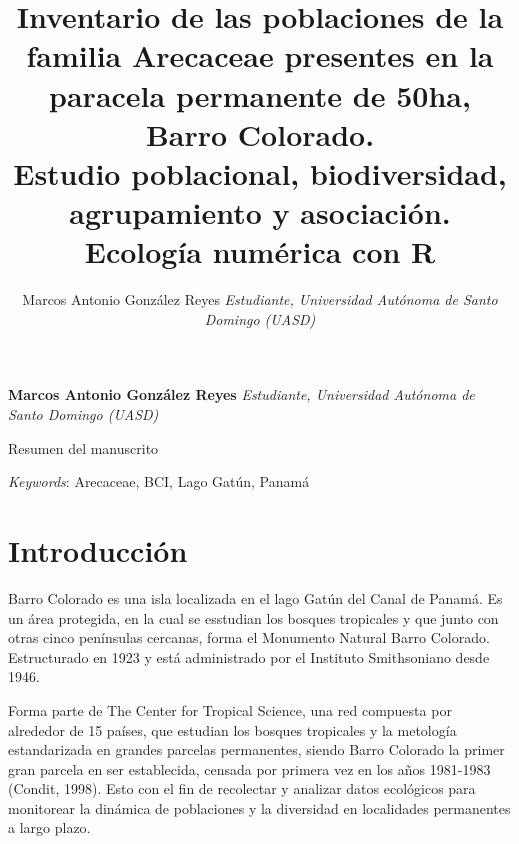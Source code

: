 \documentclass[11pt,]{article}
\title{Inventario de las poblaciones de la familia Arecaceae presentes en la
paracela permanente de 50ha, Barro Colorado.\\
Estudio poblacional, biodiversidad, agrupamiento y asociación.\\
Ecología numérica con R  }
\author{\Large Marcos Antonio González Reyes\vspace{0.05in} \newline\normalsize\emph{Estudiante, Universidad Autónoma de Santo Domingo (UASD)}  }
\date{}
\newcommand*{\authorfont}{\fontfamily{phv}\selectfont}
\renewenvironment{abstract}
 {{%
    \setlength{\leftmargin}{0mm}
    \setlength{\rightmargin}{\leftmargin}%
  }%
  \relax}
 {\endlist}
\begin{document}
	
%

{%
\setlength{\parindent}{0pt}
\thispagestyle{plain}
{\fontsize{18}{20}\selectfont\raggedright 
\maketitle  %

}

{
   \vskip 13.5pt\relax \normalsize\fontsize{11}{12} 
\textbf{\authorfont Marcos Antonio González Reyes} \hskip 15pt \emph{\small Estudiante, Universidad Autónoma de Santo Domingo (UASD)}   

}

}








\begin{abstract}

    \hbox{\vrule height .2pt width 39.14pc}

    \vskip 8.5pt %

\noindent Resumen del manuscrito


\vskip 8.5pt \noindent \emph{Keywords}: Arecaceae, BCI, Lago Gatún, Panamá \par

    \hbox{\vrule height .2pt width 39.14pc}



\end{abstract}


\vskip 6.5pt


\noindent  \section{Introducción}\label{introducciuxf3n}

Barro Colorado es una isla localizada en el lago Gatún del Canal de
Panamá. Es un área protegida, en la cual se esstudian los bosques
tropicales y que junto con otras cinco penínsulas cercanas, forma el
Monumento Natural Barro Colorado. Estructurado en 1923 y está
administrado por el Instituto Smithsoniano desde 1946.

Forma parte de The Center for Tropical Science, una red compuesta por
alrededor de 15 países, que estudian los bosques tropicales y la
metología estandarizada en grandes parcelas permanentes, siendo Barro
Colorado la primer gran parcela en ser establecida, censada por primera
vez en los años 1981-1983 (Condit, 1998). Esto con el fin de recolectar
y analizar datos ecológicos para monitorear la dinámica de poblaciones y
la diversidad en localidades permanentes a largo plazo.
\end{document}
